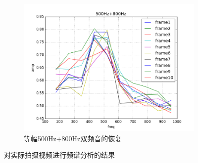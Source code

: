 \begin{figure}[h!]
\begin{center}
\begin{subfigure}[b]{.4\figwidth}
        \includegraphics[width=.4\figwidth]{res/data-500+800.png}
        \caption{等幅500Hz+800Hz双频音的恢复}
    \end{subfigure}
    \caption{对实际拍摄视频进行频谱分析的结果}
    \label{fig:real:highfreq}
\end{center}\end{figure}


